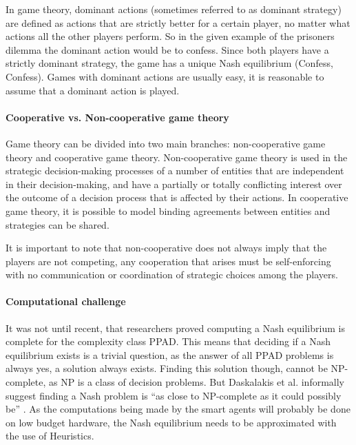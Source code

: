 In game theory, dominant actions (sometimes referred to as dominant strategy) are defined as actions that are strictly better for a certain player, no matter what actions all the other players perform. So in the given example of the prisoners dilemma the dominant action would be to confess. Since both players have a strictly dominant strategy, the game has a unique Nash equilibrium (Confess, Confess). Games with dominant actions are usually easy, it is reasonable to assume that a dominant action is played. 

\paragraph{Cooperative vs. Non-cooperative game theory} 
Game theory can be divided into two main branches: non-cooperative game theory and cooperative game theory. Non-cooperative game theory is used in the strategic decision-making processes of a number of entities that are independent in their decision-making, and have a partially or totally conflicting interest over the outcome of a decision process that is affected by their actions\cite{keypaper}. In cooperative game theory, it is possible to model binding agreements between entities and strategies can be shared. 

It is important to note that non-cooperative does not always imply that the players are not competing, any cooperation that arises must be self-enforcing with no communication or coordination of strategic choices among the players.

\paragraph{Computational challenge} 
It was not until recent, that researchers proved computing a Nash equilibrium is complete for the complexity class PPAD\cite{daskalakis2009complexity}. This means that deciding if a Nash equilibrium exists is a trivial question, as the answer of all PPAD problems is always yes, a solution always exists. Finding this solution though, cannot be NP-complete, as NP is a class of decision problems. But Daskalakis et al. informally suggest finding a Nash problem is ``as close to NP-complete as it could possibly be'' \cite{daskalakis2009complexity, Aaronson2012}. 
As the computations being made by the smart agents will probably be done on low budget hardware, the Nash equilibrium needs to be  approximated with the use of Heuristics. \cite{MicrogridModellingPetrosAristidou,AumannGameTheoryAccomplish} 

